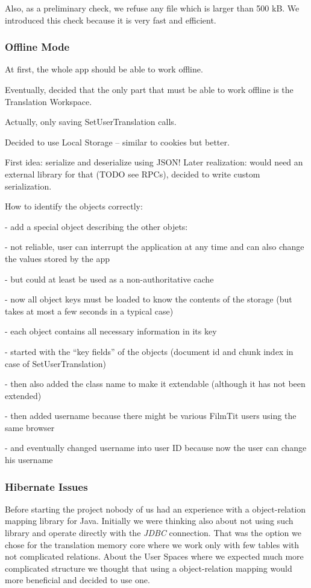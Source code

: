 Also, as a preliminary check, we refuse any file which is larger than 500 kB. We introduced this check because it is very fast and efficient.

\subsubsection{Offline Mode}

At first, the whole app should be able to work offline.

Eventually, decided that the only part that must be able to work offline is the Translation Workspace.

Actually, only saving SetUserTranslation calls.

Decided to use Local Storage -- similar to cookies but better.

First idea: serialize and deserialize using JSON!
Later realization: would need an external library for that (TODO see RPCs), decided to write custom serialization.

How to identify the objects correctly:

- add a special object describing the other objets:

  - not reliable, user can interrupt the application at any time and can also change the values stored by the app

  - but could at least be used as a non-authoritative cache
  
  - now all object keys must be loaded to know the contents of the storage (but takes at most a few seconds in a typical case)

- each object contains all necessary information in its key

  - started with the ``key fields'' of the objects (document id and chunk index in case of SetUserTranslation)
  
  - then also added the class name to make it extendable (although it has not been extended)
  
  - then added username because there might be various FilmTit users using the same browser
  
  - and eventually changed username into user ID because now the user can change his username

\subsubsection{Hibernate Issues}

Before starting the project nobody of us had an experience with a object-relation mapping library for Java. Initially we were thinking also about not using such library and operate directly with the \emph{JDBC} connection. That was the option we chose for the translation memory core where we work only with few tables with not complicated relations. About the User Spaces where we expected much more complicated structure we thought that using a object-relation mapping would more beneficial and decided to use one. 

